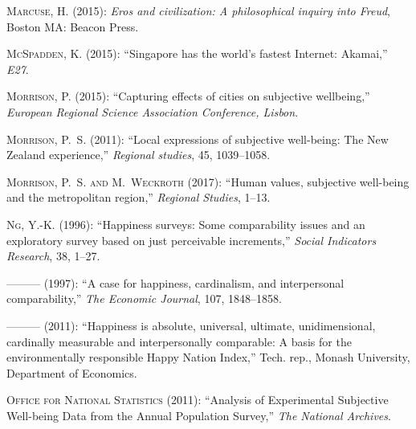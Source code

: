 \documentclass[10pt, letterpaper]{article}
\begin{document}
\begin{spacing}{2.0}
\begin{thebibliography}{115}
\textsc{Marcuse, H.} (2015): \emph{Eros and civilization: A philosophical
  inquiry into Freud}, Boston MA: Beacon Press.

\textsc{McSpadden, K.} (2015): \enquote{Singapore has the world's fastest
  Internet: Akamai,} \emph{E27}.

\textsc{Morrison, P.} (2015): \enquote{Capturing effects of cities on
  subjective wellbeing,} \emph{European Regional Science Association
  Conference, Lisbon}.

\textsc{Morrison, P.~S.} (2011): \enquote{Local expressions of subjective
  well-being: The New Zealand experience,} \emph{Regional studies}, 45,
  1039--1058.

\textsc{Morrison, P.~S. and M.~Weckroth} (2017): \enquote{Human values,
  subjective well-being and the metropolitan region,} \emph{Regional Studies},
  1--13.

\textsc{Ng, Y.-K.} (1996): \enquote{Happiness surveys: Some comparability
  issues and an exploratory survey based on just perceivable increments,}
  \emph{Social Indicators Research}, 38, 1--27.

---\hspace{-.1pt}---\hspace{-.1pt}--- (1997): \enquote{A case for happiness,
  cardinalism, and interpersonal comparability,} \emph{The Economic Journal},
  107, 1848--1858.

---\hspace{-.1pt}---\hspace{-.1pt}--- (2011): \enquote{Happiness is absolute,
  universal, ultimate, unidimensional, cardinally measurable and
  interpersonally comparable: A basis for the environmentally responsible Happy
  Nation Index,} Tech. rep., Monash University, Department of Economics.

\textsc{{Office for National Statistics}} (2011): \enquote{Analysis of
  Experimental Subjective Well-being Data from the Annual Population Survey,}
  \emph{The National Archives}.


\end{thebibliography}
\end{spacing}
\end{document}
